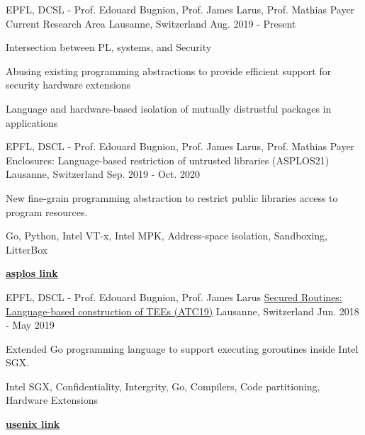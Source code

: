 


\begin{cventries}

\cventry
{EPFL, DCSL - Prof. Edouard Bugnion, Prof. James Larus, Prof. Mathias Payer}
{Current Research Area}
{Lausanne, Switzerland}
{Aug. 2019 - Present}
{ %
	\begin{cvitems}
  \item{Intersection between PL, systems, and Security}
	\item{Abusing existing programming abstractions to provide efficient support for
    security hardware extensions}
  \item{Language and hardware-based isolation of mutually distrustful packages in applications}
	\end{cvitems}
}

\cventry
{EPFL, DSCL - Prof. Edouard Bugnion, Prof. James Larus, Prof. Mathias Payer}
  {Enclosures: Language-based restriction of untrusted libraries (ASPLOS21)}
{Lausanne, Switzerland}
{Sep. 2019  - Oct. 2020}
{
	\begin{cvitems}
  \item{New fine-grain programming abstraction to restrict public libraries access to program resources.}
  \item{Go, Python, Intel VT-x, Intel MPK, Address-space isolation, Sandboxing, LitterBox}
  \item{\href{https://asplos-conference.org/papers/}{\textbf{asplos link}}}
	\end{cvitems}
}

\cventry
{EPFL, DSCL - Prof. Edouard Bugnion, Prof. James Larus}
  {\href{https://www.usenix.org/system/files/atc19-ghosn_0.pdf}{Secured Routines: Language-based construction of TEEs (ATC19)}}
{Lausanne, Switzerland}
{Jun. 2018  - May 2019}
{
	\begin{cvitems}
  \item{Extended Go programming language to  support executing goroutines inside Intel SGX.}
	\item{Intel SGX, Confidentiality, Intergrity, Go, Compilers, Code partitioning, Hardware Extensions}
  \item{\href{https://www.usenix.org/conference/atc19/presentation/ghosn}{\textbf{usenix link}}}
	\end{cvitems}
}


\end{cventries}
